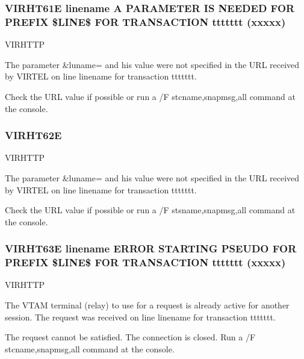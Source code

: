 \documentclass[letterpaper,10pt,english]{sphinxmanual}
\begin{document}
\subsubsection{VIRHT61E linename A PARAMETER IS NEEDED FOR PREFIX \$LINE\$ FOR TRANSACTION ttttttt (xxxxx)}
\label{\detokenize{messages:virht61e-linename-a-parameter-is-needed-for-prefix-line-for-transaction-ttttttt-xxxxx}}\begin{description}
\sphinxAtStartPar
VIRHTTP

\sphinxAtStartPar
The parameter \&luname= and his value were not specified in the URL received by VIRTEL on line linename for transaction ttttttt.

\sphinxAtStartPar
Check the URL value if possible or run a /F stcname,snapmsg,all command at the console.

\end{description}


\subsubsection{VIRHT62E}
\label{\detokenize{messages:virht62e}}\begin{description}
\sphinxAtStartPar
VIRHTTP

\sphinxAtStartPar
The parameter \&luname= and his value were not specified in the URL received by VIRTEL on line linename for transaction ttttttt.

\sphinxAtStartPar
Check the URL value if possible or run a /F stsname,snapmsg,all command at the console.

\end{description}


\subsubsection{VIRHT63E linename ERROR STARTING PSEUDO FOR PREFIX \$LINE\$ FOR TRANSACTION ttttttt (xxxxx)}
\label{\detokenize{messages:virht63e-linename-error-starting-pseudo-for-prefix-line-for-transaction-ttttttt-xxxxx}}\begin{description}
\sphinxAtStartPar
VIRHTTP

\sphinxAtStartPar
The VTAM terminal (relay) to use for a request is already active for another session. The request was received on line linename for transaction ttttttt.

\sphinxAtStartPar
The request cannot be satisfied. The connection is closed. Run a /F stcname,snapmsg,all command at the console.

\end{description}
\end{document}
